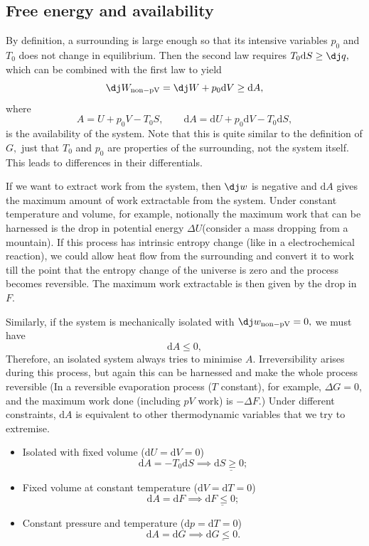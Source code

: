 \documentclass{article}
\theoremstyle{nonumberplain}
\begin{document}
\subsection{Free energy and availability}
\label{subsec:availability}
By definition, a surrounding is large enough so that its intensive variables $p_0$ and $T_0$ does not change in equilibrium. Then the second law requires
\(
    T_0 \mathrm{d} S \geq  \mathrm{\dj} q,
\)
which can be combined with the first law to yield
\[
    \mathrm{\dj} W_{\mathrm{non-pV} } = \mathrm{\dj} W + p_0 \mathrm{d} V
    \geq \mathrm{d} A,  
\]
where 
\[
    \boxed{A = U + p_0 V - T_0 S,\qquad \mathrm{d}A = \mathrm{d} U + p_{0} \mathrm{d} V - T_0  \mathrm{d} S ,} 
\]
is the availability of the system. Note that this is quite similar to the definition of $G,$ just that $T_0$ and $p_0$ are properties of the surrounding, not the system itself. This leads to differences in their differentials.

If we want to extract work from the system, then $\mathrm{\dj}w $ is negative and $\mathrm{d} A$ gives the maximum amount of work extractable from the system. Under constant temperature and volume, for example, notionally the maximum work that can be harnessed is the drop in potential energy $\Delta U$(consider a mass dropping from a mountain). If this process has intrinsic entropy change (like in a electrochemical reaction), we could allow heat flow from the surrounding and convert it to work till the point that the entropy change of the universe is zero and the process becomes reversible. The maximum work extractable is then given by the drop in $F.$

Similarly, if the system is mechanically isolated with $\mathrm{\dj} w_{\mathrm{non-pV} } = 0, $ we must have
\[
    \mathrm{d}A \leq  0,
\]
Therefore, an isolated system always tries to minimise $A.$ Irreversibility arises during this process, but again this can be harnessed and make the whole process reversible (In a reversible evaporation process ($T$ constant), for example, $\Delta G = 0$, and the maximum work done (including $pV$ work) is $-\Delta F.$) Under different constraints, $\mathrm{d}A $ is equivalent to other thermodynamic variables that we try to extremise. 
\begin{itemize}
    \item Isolated with fixed volume ($\mathrm{d} U = \mathrm{d} V = 0$) \\
    \[
        \mathrm{d} A = -T_0 \mathrm{d} S \implies \underline{\mathrm{d} S \geq 0;} 
    \]
    \item Fixed volume at constant temperature ($\mathrm{d} V = \mathrm{d} T = 0$) \\
    \[
        \mathrm{d} A = \mathrm{d} F \implies \underline{\mathrm{d} F \leq  0;}
    \]
    \item Constant pressure and temperature ($\mathrm{d} p = \mathrm{d} T = 0$) \\ 
    \[
        \mathrm{d} A = \mathrm{d} G \implies  \underline{\mathrm{d} G \leq  0.}
    \]
\end{itemize} 
\end{document}
